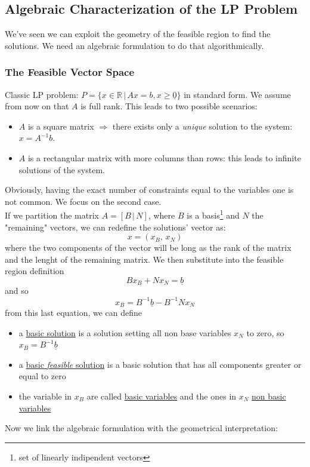 \documentclass{article}
\begin{document}
		\subsection{Algebraic Characterization of the LP Problem}
			We've seen we can exploit the geometry of the feasible region to find the solutions. We need an algebraic formulation to do that algorithmically.

			\subsubsection{The Feasible Vector Space}
				Classic LP problem: $P=\{x \in \mathbb{R} \,\vert\, Ax = b, x \geq \underline{0}\}$ in standard form. We assume from now on that $A$ is full rank. This leads to two possible scenarios:
				\begin{itemize}
					\item $A$ is a square matrix $\Rightarrow$ there exists only a \textit{unique} solution to the system: $x = A^{-1}b$.
					\item $A$ is a rectangular matrix with more columns than rows: this leads to infinite solutions of the system.
				\end{itemize}
				Obviously, having the exact number of constraints equal to the variables one is not common. We focus on the second case.\\
				If we partition the matrix $A = [B \,\vert\, N]$, where $B$ is a basis\footnote{set of linearly indipendent vectors} and $N$ the "remaining" vectors, we can redefine the solutions' vector as:
				\begin{equation}
					x = (x_B,\, x_N)
				\end{equation}
				where the two components of the vector will be long as the rank of the matrix and the lenght of the remaining matrix. We then substitute into the feasible region definition
				\begin{equation}
					Bx_{B} + Nx_{N} = \underline{b}
				\end{equation}
				and so
				\begin{equation}
					x_{B} = B^{-1}\underline{b} - B^{-1}Nx_{N}
				\end{equation}
				from this last equation, we can define
				\begin{itemize}
					\item a \underline{basic solution} is a solution setting all non base variables $x_{N}$ to zero, so $x_B = B^{-1}\underline{b}$
					\item a \underline{basic \textit{feasible} solution} is a basic solution that has all components greater or equal to zero
					\item the variable in $x_B$ are called \underline{basic variables} and the ones in $x_N$ \underline{non basic variables}
				\end{itemize}
				Now we link the algebraic formulation with the geometrical interpretation:
\end{document}
